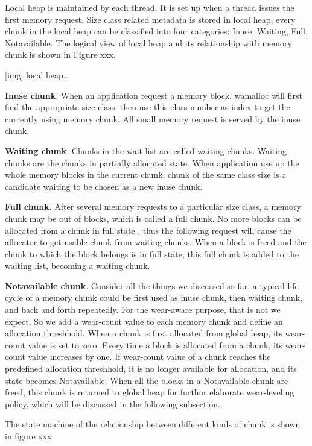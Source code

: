 \documentclass{vldb}
\begin{document}
Local heap is maintained by each thread. 
It is set up when a thread issues the first memory request.
Size class related metadata is stored in local heap, every chunk in the local heap can be classified into four categories: Inuse, Waiting, Full, Notavailable. 
The logical view of local heap and its relationship with memory chunk is shown in Figure xxx.

[img] local heap..

\textbf{Inuse chunk}. When an application request a memory block, wamalloc will first find the appropriate size class, then use this class number as index to get the currently using memory chunk. 
All small memory request is served by the inuse chunk.

\textbf{Waiting chunk}. Chunks in the wait list are called waiting chunks. Waiting chunks are the chunks in partially allocated state. 
When application use up the whole memory blocks in the current chunk, chunk of the same class size is a candidate waiting to be chosen as a new inuse chunk.

\textbf{Full chunk}. After several memory requests to a particular size class, a memory chunk may be out of blocks, which is called a full chunk.
No more blocks can be allocated from a chunk in full state , thus the following request will cause the allocator to get usable chunk from waiting chunks.
When a block is freed and the chunk to which the block belongs is in full state, this full chunk is added to the waiting list, becoming a waiting chunk.

\textbf{Notavailable chunk}. Consider all the things we discussed so far, a typical life cycle of a memory chunk could be first used as inuse chunk, then waiting chunk, and back and forth repeatedly. 
For the wear-aware purpose, that is not we expect. 
So we add a wear-count value to each memory chunk and define an allocation threshhold. 
When a chunk is first allocated from global heap, its wear-count value is set to zero.
Every time a block is allocated from a chunk, its wear-count value increases by one. 
If wear-count value of a chunk reaches the predefined allocation threshhold, it is no longer available for allocation, and its state becomes Notavailable. 
When all the blocks in a Notavailable chunk are freed, this chunk is returned to global heap for furthur elaborate wear-leveling policy, which will be discussed in the following subsection.

The state machine of the relationship between different kinds of chunk is shown in figure xxx.
\end{document}
